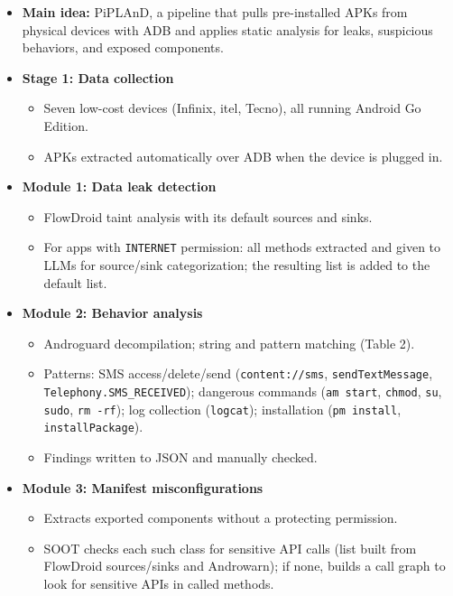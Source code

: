 \documentclass[11pt,a4paper]{article}
\begin{document}
\begin{enumerate}
    \begin{itemize}[leftmargin=*,itemsep=1pt,topsep=2pt]
        \item \textbf{Main idea:} PiPLAnD, a pipeline that pulls pre-installed APKs from physical devices with ADB and applies static analysis for leaks, suspicious behaviors, and exposed components.
        \item \textbf{Stage 1: Data collection}
        \begin{itemize}[itemsep=0pt]
            \item Seven low-cost devices (Infinix, itel, Tecno), all running Android Go Edition.
            \item APKs extracted automatically over ADB when the device is plugged in.
        \end{itemize}
        \item \textbf{Module 1: Data leak detection}
        \begin{itemize}[itemsep=0pt]
            \item FlowDroid taint analysis with its default sources and sinks.
            \item For apps with \texttt{INTERNET} permission: all methods extracted and given to LLMs for source/sink categorization; the resulting list is added to the default list.
        \end{itemize}
        \item \textbf{Module 2: Behavior analysis}
        \begin{itemize}[itemsep=0pt]
            \item Androguard decompilation; string and pattern matching (Table 2).
            \item Patterns: SMS access/delete/send (\texttt{content://sms}, \texttt{sendTextMessage}, \texttt{Telephony.SMS\_RECEIVED}); dangerous commands (\texttt{am start}, \texttt{chmod}, \texttt{su}, \texttt{sudo}, \texttt{rm -rf}); log collection (\texttt{logcat}); installation (\texttt{pm install}, \texttt{installPackage}).
            \item Findings written to JSON and manually checked.
        \end{itemize}
        \item \textbf{Module 3: Manifest misconfigurations}
        \begin{itemize}[itemsep=0pt]
            \item Extracts exported components without a protecting permission.
            \item SOOT checks each such class for sensitive API calls (list built from FlowDroid sources/sinks and Androwarn); if none, builds a call graph to look for sensitive APIs in called methods.
        \end{itemize}
    \end{itemize}


\end{enumerate}
\end{document}
